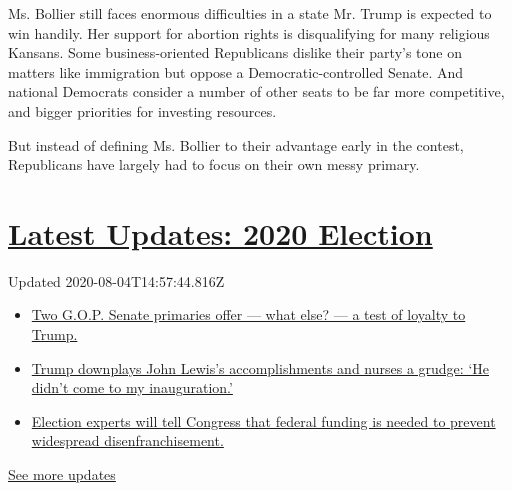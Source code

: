 Ms. Bollier still faces enormous difficulties in a state Mr. Trump is
expected to win handily. Her support for abortion rights is
disqualifying for many religious Kansans. Some business-oriented
Republicans dislike their party's tone on matters like immigration but
oppose a Democratic-controlled Senate. And national Democrats consider a
number of other seats to be far more competitive, and bigger priorities
for investing resources.

But instead of defining Ms. Bollier to their advantage early in the
contest, Republicans have largely had to focus on their own messy
primary.

\hypertarget{latest-updates-2020-election}{%
\section{\texorpdfstring{\href{https://www.nytimes.com/2020/08/04/us/elections/primary-election-michigan-arizona-kansas.html?action=click\&pgtype=Article\&state=default\&region=MAIN_CONTENT_1\&context=storylines_live_updates}{Latest
Updates: 2020
Election}}{Latest Updates: 2020 Election}}\label{latest-updates-2020-election}}

Updated 2020-08-04T14:57:44.816Z

\begin{itemize}
\tightlist
\item
  \href{https://www.nytimes.com/2020/08/04/us/elections/primary-election-michigan-arizona-kansas.html?action=click\&pgtype=Article\&state=default\&region=MAIN_CONTENT_1\&context=storylines_live_updates\#link-3924dd44}{Two
  G.O.P. Senate primaries offer --- what else? --- a test of loyalty to
  Trump.}
\item
  \href{https://www.nytimes.com/2020/08/04/us/elections/primary-election-michigan-arizona-kansas.html?action=click\&pgtype=Article\&state=default\&region=MAIN_CONTENT_1\&context=storylines_live_updates\#link-24333e8c}{Trump
  downplays John Lewis's accomplishments and nurses a grudge: `He didn't
  come to my inauguration.'}
\item
  \href{https://www.nytimes.com/2020/08/04/us/elections/primary-election-michigan-arizona-kansas.html?action=click\&pgtype=Article\&state=default\&region=MAIN_CONTENT_1\&context=storylines_live_updates\#link-3c437e05}{Election
  experts will tell Congress that federal funding is needed to prevent
  widespread disenfranchisement.}
\end{itemize}

\href{https://www.nytimes.com/2020/08/04/us/elections/primary-election-michigan-arizona-kansas.html?action=click\&pgtype=Article\&state=default\&region=MAIN_CONTENT_1\&context=storylines_live_updates}{See
more updates}

